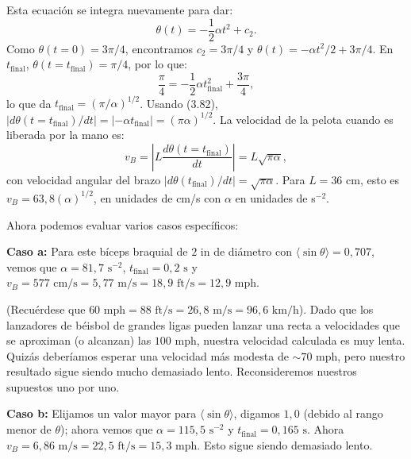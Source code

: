 \documentclass[12pt]{book}
\begin{document}
Esta ecuación se integra nuevamente para dar:
\begin{equation}
\theta(t) = -\frac{1}{2}\alpha t^2 + c_2.
\label{eq:3.83}
\end{equation}
Como $\theta(t = 0) = 3\pi/4$, encontramos $c_2 = 3\pi/4$ y $\theta(t) = -\alpha t^2/2 + 3\pi/4$. En $t_{\text{final}}$, $\theta(t = t_{\text{final}}) = \pi/4$, por lo que:
\begin{equation}
\frac{\pi}{4} = -\frac{1}{2}\alpha t_{\text{final}}^2 + \frac{3\pi}{4},
\label{eq:3.84}
\end{equation}
lo que da $t_{\text{final}} = (\pi/\alpha)^{1/2}$. Usando (3.82), $|d\theta(t = t_{\text{final}})/dt| = |-\alpha t_{\text{final}}| = (\pi\alpha)^{1/2}$. La velocidad de la pelota cuando es liberada por la mano es:
\begin{equation}
v_B = \left|L\frac{d\theta(t = t_{\text{final}})}{dt}\right| = L\sqrt{\pi\alpha},
\label{eq:3.85}
\end{equation}
con velocidad angular del brazo $|d\theta(t_{\text{final}})/dt| = \sqrt{\pi\alpha}$. Para $L = 36\text{ cm}$, esto es $v_B = 63{,}8(\alpha)^{1/2}$, en unidades de cm/s con $\alpha$ en unidades de s$^{-2}$.

Ahora podemos evaluar varios casos específicos:

\textbf{Caso a:} Para este bíceps braquial de $2\text{ in}$ de diámetro con $\langle\sin\theta\rangle = 0{,}707$, vemos que $\alpha = 81{,}7\text{ s}^{-2}$, $t_{\text{final}} = 0{,}2\text{ s}$ y $v_B = 577\text{ cm/s} = 5{,}77\text{ m/s} = 18{,}9\text{ ft/s} = 12{,}9\text{ mph}$.


(Recuérdese que $60\text{ mph} = 88\text{ ft/s} = 26{,}8\text{ m/s} = 96{,}6\text{ km/h}$). Dado que los lanzadores de béisbol de grandes ligas pueden lanzar una recta a velocidades que se aproximan (o alcanzan) las $100\text{ mph}$, nuestra velocidad calculada es muy lenta. Quizás deberíamos esperar una velocidad más modesta de $\sim 70\text{ mph}$, pero nuestro resultado sigue siendo mucho demasiado lento. Reconsideremos nuestros supuestos uno por uno.

\textbf{Caso b:} Elijamos un valor mayor para $\langle\sin\theta\rangle$, digamos $1{,}0$ (debido al rango menor de $\theta$); ahora vemos que $\alpha = 115{,}5\text{ s}^{-2}$ y $t_{\text{final}} = 0{,}165\text{ s}$. Ahora $v_B = 6{,}86\text{ m/s} = 22{,}5\text{ ft/s} = 15{,}3\text{ mph}$. Esto sigue siendo demasiado lento.
\end{document}
